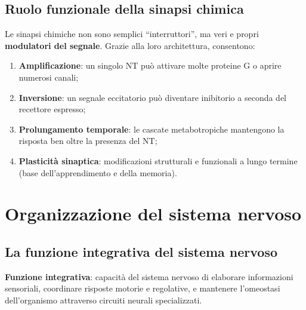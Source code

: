 \documentclass[11pt,a4paper,italian,twoside]{report}
\theoremstyle{definition} %
\begin{document}
\section{Ruolo funzionale della sinapsi chimica}
\label{sec:ruolo_funzionale}

Le sinapsi chimiche non sono semplici ``interruttori'', ma veri e propri \textbf{modulatori del segnale}. Grazie alla loro architettura, consentono:
\begin{enumerate}
  \item \textbf{Amplificazione}: un singolo NT può attivare molte proteine G o aprire numerosi canali;
  \item \textbf{Inversione}: un segnale eccitatorio può diventare inibitorio a seconda del recettore espresso;
  \item \textbf{Prolungamento temporale}: le cascate metabotropiche mantengono la risposta ben oltre la presenza del NT;
  \item \textbf{Plasticità sinaptica}: modificazioni strutturali e funzionali a lungo termine (base dell'apprendimento e della memoria).
\end{enumerate}



\chapter{Organizzazione del sistema nervoso}
\label{chap:org_sistema_nervoso}

\section{La funzione integrativa del sistema nervoso}
\label{sec:funzione_integrativa}

\begin{definizione}
\textbf{Funzione integrativa}: capacità del sistema nervoso di elaborare informazioni sensoriali, coordinare risposte motorie e regolative, e mantenere l'omeostasi dell'organismo attraverso circuiti neurali specializzati.
\end{definizione}
\end{document}

